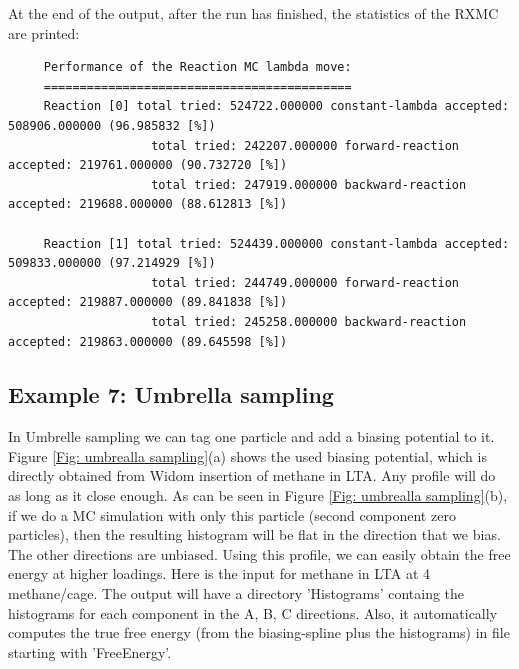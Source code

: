 At the end of the output, after the run has finished, the statistics of the RXMC are printed:
\begin{tiny}
\begin{verbatim}
     Performance of the Reaction MC lambda move:
     ===========================================
     Reaction [0] total tried: 524722.000000 constant-lambda accepted: 508906.000000 (96.985832 [%])
                    total tried: 242207.000000 forward-reaction accepted: 219761.000000 (90.732720 [%])
                    total tried: 247919.000000 backward-reaction accepted: 219688.000000 (88.612813 [%])
     
     Reaction [1] total tried: 524439.000000 constant-lambda accepted: 509833.000000 (97.214929 [%])
                    total tried: 244749.000000 forward-reaction accepted: 219887.000000 (89.841838 [%])
                    total tried: 245258.000000 backward-reaction accepted: 219863.000000 (89.645598 [%])
\end{verbatim}
\end{tiny}

\subsection*{Example 7: Umbrella sampling}

In Umbrelle sampling we can tag one particle and add a biasing potential to it. Figure \ref{Fig: umbrealla sampling}(a)
shows the used biasing potential, which is directly obtained from Widom insertion of methane in LTA. Any profile will
do as long as it close enough. 
As can be seen in Figure \ref{Fig: umbrealla sampling}(b), if we do a MC simulation
with only this particle (second component zero particles), 
then the resulting histogram will be flat in the direction that we bias. The other directions are unbiased.
Using this profile, we can easily obtain the free energy at higher loadings. Here is the input for methane in LTA at 4 methane/cage.
The output will have a directory 'Histograms' containg the histograms for each component in the A, B, C directions. Also, it automatically
computes the true free energy (from the biasing-spline plus the histograms) in file starting with 'FreeEnergy'.

